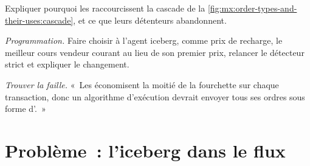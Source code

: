 \begin{exercise}[$\star\star$]\label{exo:mx:order-types-and-their-uses:6}
Expliquer pourquoi les  raccourcissent la cascade de la \cref{fig:mx:order-types-and-their-uses:cascade}, et ce que leurs détenteurs abandonnent.
\end{exercise}

\begin{exercise}[$\star\star\star$]\label{exo:mx:order-types-and-their-uses:7}
\emph{Programmation.} Faire choisir à l'agent iceberg, comme prix de recharge, le meilleur cours vendeur courant au lieu de son premier prix, relancer le détecteur strict et expliquer
le changement.
\end{exercise}

\begin{exercise}[$\star\star\star$]\label{exo:mx:order-types-and-their-uses:8}
\emph{Trouver la faille.} «~Les  économisent la moitié de la fourchette sur chaque transaction, donc un algorithme d'exécution devrait envoyer tous ses ordres sous forme d'.~»
\end{exercise}

\section{Problème~: l'iceberg dans le flux}

